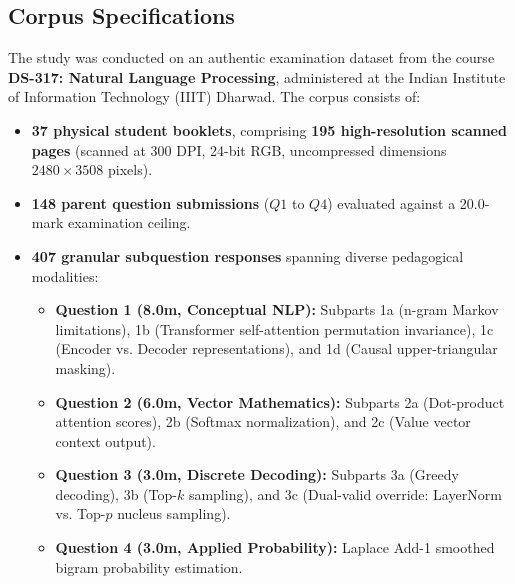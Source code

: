 \documentclass[journal]{IEEEtran}
\begin{document}
\subsection{Corpus Specifications}
The study was conducted on an authentic examination dataset from the course \textbf{DS-317: Natural Language Processing}, administered at the Indian Institute of Information Technology (IIIT) Dharwad. The corpus consists of:
\begin{itemize}
    \item \textbf{37 physical student booklets}, comprising \textbf{195 high-resolution scanned pages} (scanned at 300 DPI, 24-bit RGB, uncompressed dimensions $2480 \times 3508$ pixels).
    \item \textbf{148 parent question submissions} ($Q1$ to $Q4$) evaluated against a 20.0-mark examination ceiling.
    \item \textbf{407 granular subquestion responses} spanning diverse pedagogical modalities:
    \begin{itemize}
        \item \textbf{Question 1 (8.0m, Conceptual NLP):} Subparts 1a (n-gram Markov limitations), 1b (Transformer self-attention permutation invariance), 1c (Encoder vs. Decoder representations), and 1d (Causal upper-triangular masking).
        \item \textbf{Question 2 (6.0m, Vector Mathematics):} Subparts 2a (Dot-product attention scores), 2b (Softmax normalization), and 2c (Value vector context output).
        \item \textbf{Question 3 (3.0m, Discrete Decoding):} Subparts 3a (Greedy decoding), 3b (Top-$k$ sampling), and 3c (Dual-valid override: LayerNorm vs. Top-$p$ nucleus sampling).
        \item \textbf{Question 4 (3.0m, Applied Probability):} Laplace Add-1 smoothed bigram probability estimation.
    \end{itemize}
\end{itemize}
\end{document}
